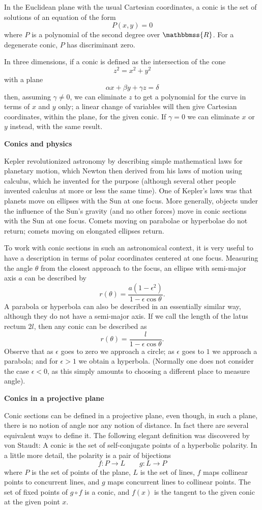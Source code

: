 \documentclass[12pt]{article}
\newcommand{\R}{\mathbbmss{R}}
\begin{document}
In the Euclidean plane with the usual Cartesian coordinates,
a conic is the set of solutions of an equation of the form
$$P(x,y)=0$$
where $P$ is a polynomial of the second degree over $\R$.
For a degenerate conic, $P$ has discriminant zero.

In three dimensions, if a conic is defined as the intersection
of the cone
$$z^2=x^2+y^2$$
with a plane
$$\alpha x + \beta y + \gamma z = \delta$$
then, assuming $\gamma\ne 0$, we can eliminate $z$ to get a
polynomial for the curve in terms of $x$ and $y$ only; a
linear change of variables will then give Cartesian coordinates,
within the plane, for the given conic.
If $\gamma=0$ we can eliminate $x$ or $y$ instead, with the same
result.

\textbf{Conics and physics}

Kepler revolutionized astronomy by describing simple mathematical laws for planetary motion, which Newton then derived from his laws of motion using calculus, which he invented for the purpose (although several other people invented calculus at more or less the same time).  One of Kepler's laws was that planets move on ellipses with the Sun at one focus. More generally, objects under the influence of the Sun's gravity (and no other forces) move in conic sections with the Sun at one focus. Comets moving on parabolae or hyperbolae do not return; comets moving on elongated ellipses return. 

To work with conic sections in such an astronomical context, it is very useful to have a description in terms of polar coordinates centered at one focus. Measuring the angle $\theta$ from the closest approach to the focus, an ellipse with semi-major axis $a$ can be described by
\[
r(\theta) = \frac{a(1-\epsilon^2)}{1-\epsilon\cos\theta}.
\]
A parabola or hyperbola can also be described in an essentially similar way, although they do not have a semi-major axis.  If we call the length of the latus rectum $2l$, then any conic can be described as
\[
r(\theta) = \frac{l}{1-\epsilon\cos\theta}.
\]
Observe that as $\epsilon$ goes to zero we approach a circle; as $\epsilon$ goes to $1$ we approach a parabola; and for $\epsilon>1$ we obtain a hyperbola. (Normally one does not consider the case $\epsilon<0$, as this simply amounts to choosing a different place to measure angle).

\textbf{Conics in a projective plane}

Conic sections can be defined in a projective plane, even though,
in such a plane, there is no notion of angle nor any notion of distance.
In fact there are several equivalent ways to define it.
The following elegant definition
was discovered by von Staudt:
A conic is the set of self-conjugate points of a hyperbolic polarity.
In a little more detail, the polarity is a pair of bijections
$$f:P\to L\qquad g:L\to P$$
where $P$ is the set of points of the plane, $L$ is the set of lines,
$f$ maps collinear points to concurrent lines, and $g$ maps concurrent lines
to collinear points.
The set of fixed points of $g\circ f$ is a conic, and $f(x)$ is the tangent
to the given conic at the given point $x$.
\end{document}
